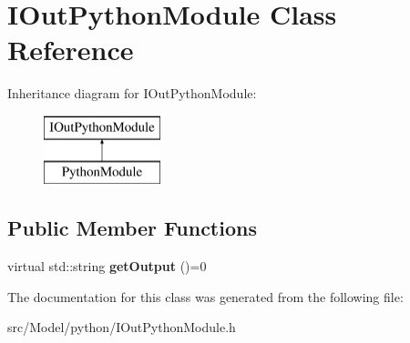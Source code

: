 \hypertarget{classIOutPythonModule}{}\section{I\+Out\+Python\+Module Class Reference}
\label{classIOutPythonModule}
Inheritance diagram for I\+Out\+Python\+Module\+:\begin{figure}[H]
\begin{center}
\leavevmode
\includegraphics[height=2.000000cm]{classIOutPythonModule}
\end{center}
\end{figure}
\subsection*{Public Member Functions}
\begin{DoxyCompactItemize}
\item 
virtual std\+::string {\bfseries get\+Output} ()=0\hypertarget{classIOutPythonModule_a230c1ccb5beee5229e0f36d3500f266f}{}\label{classIOutPythonModule_a230c1ccb5beee5229e0f36d3500f266f}

\end{DoxyCompactItemize}


The documentation for this class was generated from the following file\+:\begin{DoxyCompactItemize}
\item 
src/\+Model/python/I\+Out\+Python\+Module.\+h\end{DoxyCompactItemize}
